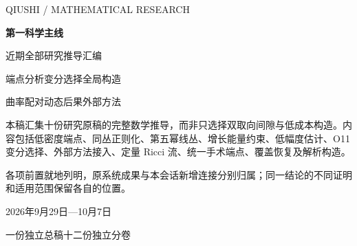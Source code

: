 \documentclass[UTF8,11pt,openany,oneside,fontset=none]{ctexbook}
\begin{document}
\begin{titlepage}\centering
\vspace*{14mm}
{\sffamily\small QIUSHI / MATHEMATICAL RESEARCH\par}
\vspace{14mm}
{\Huge\bfseries 第一科学主线\par}
\vspace{6mm}
{\LARGE 近期全部研究推导汇编\par}
\vspace{10mm}
{\large 端点分析\quad 变分选择\quad 全局构造\par}
\vspace{4mm}
{\large 曲率配对\quad 动态后果\quad 外部方法\par}
\vspace{15mm}
\begin{minipage}{0.83\textwidth}
本稿汇集十份研究原稿的完整数学推导，而非只选择双取向间隙与低成本构造。内容包括低密度端点、同丛正则化、第五幂线丛、增长能量约束、低幅度估计、O11 变分选择、外部方法接入、定量 Ricci 流、统一手术端点、覆盖恢复及解析构造。

各项前置就地列明，原系统成果与本会话新增连接分别归属；同一结论的不同证明和适用范围保留各自的位置。
\end{minipage}
\vfill
{\large 2026年9月29日—10月7日\par}
\vspace{5mm}
{\small 一份独立总稿\quad 十二份独立分卷\par}
\end{titlepage}
\frontmatter
\end{document}
